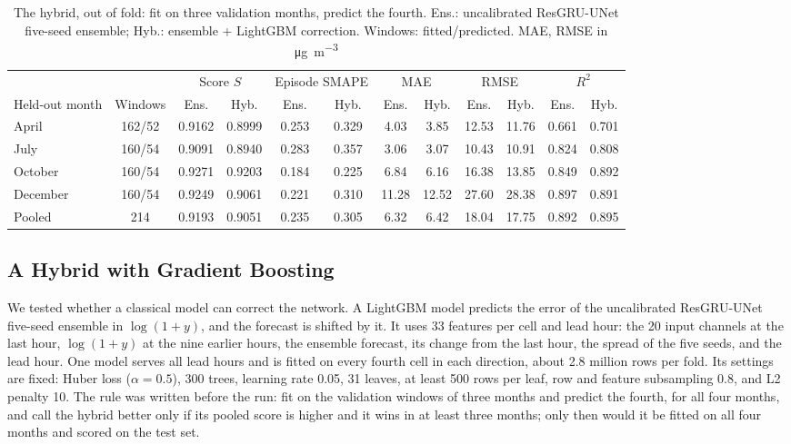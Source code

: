 \documentclass[journal]{IEEEtran}
\newcommand{\ugm}{\si{\micro\gram\per\cubic\metre}}
\begin{document}
\begin{table}[t]
\centering
\caption{The hybrid, out of fold: fit on three validation months, predict the fourth. Ens.: uncalibrated ResGRU-UNet five-seed ensemble; Hyb.: ensemble + LightGBM correction. Windows: fitted/predicted. MAE, RMSE in \ugm}
\label{tab:hybrid}
\setlength{\tabcolsep}{4pt}
\begin{tabular}{@{}lccccccccccc@{}}
\toprule
 & & \multicolumn{2}{c}{Score $S$} & \multicolumn{2}{c}{Episode SMAPE} & \multicolumn{2}{c}{MAE} & \multicolumn{2}{c}{RMSE} & \multicolumn{2}{c}{$R^2$} \\
\cmidrule(lr){3-4}\cmidrule(lr){5-6}\cmidrule(lr){7-8}\cmidrule(lr){9-10}\cmidrule(l){11-12}
Held-out month & Windows & Ens. & Hyb. & Ens. & Hyb. & Ens. & Hyb. & Ens. & Hyb. & Ens. & Hyb. \\
\midrule
April & 162/52 & 0.9162 & 0.8999 & 0.253 & 0.329 & 4.03 & 3.85 & 12.53 & 11.76 & 0.661 & 0.701 \\
July & 160/54 & 0.9091 & 0.8940 & 0.283 & 0.357 & 3.06 & 3.07 & 10.43 & 10.91 & 0.824 & 0.808 \\
October & 160/54 & 0.9271 & 0.9203 & 0.184 & 0.225 & 6.84 & 6.16 & 16.38 & 13.85 & 0.849 & 0.892 \\
December & 160/54 & 0.9249 & 0.9061 & 0.221 & 0.310 & 11.28 & 12.52 & 27.60 & 28.38 & 0.897 & 0.891 \\
\midrule
Pooled & 214 & 0.9193 & 0.9051 & 0.235 & 0.305 & 6.32 & 6.42 & 18.04 & 17.75 & 0.892 & 0.895 \\
\bottomrule
\end{tabular}
\end{table}

\subsection{A Hybrid with Gradient Boosting}
\label{sec:hybrid}
We tested whether a classical model can correct the network. A LightGBM model \cite{ke2017lightgbm} predicts the error of the uncalibrated ResGRU-UNet five-seed ensemble in $\log(1+y)$, and the forecast is shifted by it. It uses 33 features per cell and lead hour: the 20 input channels at the last hour, $\log(1+y)$ at the nine earlier hours, the ensemble forecast, its change from the last hour, the spread of the five seeds, and the lead hour. One model serves all lead hours and is fitted on every fourth cell in each direction, about 2.8 million rows per fold. Its settings are fixed: Huber loss ($\alpha=0.5$), 300 trees, learning rate 0.05, 31 leaves, at least 500 rows per leaf, row and feature subsampling 0.8, and L2 penalty 10. The rule was written before the run: fit on the validation windows of three months and predict the fourth, for all four months, and call the hybrid better only if its pooled score is higher and it wins in at least three months; only then would it be fitted on all four months and scored on the test set.
\end{document}
